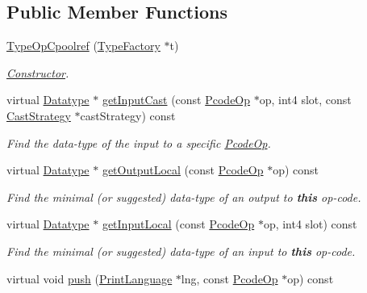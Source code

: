 \subsection*{Public Member Functions}
\begin{DoxyCompactItemize}
\item 
\mbox{\hyperlink{class_type_op_cpoolref_af24f28c844c4c945ef9a223b48d2e955}{Type\+Op\+Cpoolref}} (\mbox{\hyperlink{class_type_factory}{Type\+Factory}} $\ast$t)
\begin{DoxyCompactList}\small\item\em \mbox{\hyperlink{class_constructor}{Constructor}}. \end{DoxyCompactList}\item 
virtual \mbox{\hyperlink{class_datatype}{Datatype}} $\ast$ \mbox{\hyperlink{class_type_op_cpoolref_a5cc9b6921ce5b3672dc96af17134474f}{get\+Input\+Cast}} (const \mbox{\hyperlink{class_pcode_op}{Pcode\+Op}} $\ast$op, int4 slot, const \mbox{\hyperlink{class_cast_strategy}{Cast\+Strategy}} $\ast$cast\+Strategy) const
\begin{DoxyCompactList}\small\item\em Find the data-\/type of the input to a specific \mbox{\hyperlink{class_pcode_op}{Pcode\+Op}}. \end{DoxyCompactList}\item 
virtual \mbox{\hyperlink{class_datatype}{Datatype}} $\ast$ \mbox{\hyperlink{class_type_op_cpoolref_af6f8c8b7ce807d7773e55820c11a08f1}{get\+Output\+Local}} (const \mbox{\hyperlink{class_pcode_op}{Pcode\+Op}} $\ast$op) const
\begin{DoxyCompactList}\small\item\em Find the minimal (or suggested) data-\/type of an output to {\bfseries{this}} op-\/code. \end{DoxyCompactList}\item 
virtual \mbox{\hyperlink{class_datatype}{Datatype}} $\ast$ \mbox{\hyperlink{class_type_op_cpoolref_a08047a47da143613ebf78d36dd22c564}{get\+Input\+Local}} (const \mbox{\hyperlink{class_pcode_op}{Pcode\+Op}} $\ast$op, int4 slot) const
\begin{DoxyCompactList}\small\item\em Find the minimal (or suggested) data-\/type of an input to {\bfseries{this}} op-\/code. \end{DoxyCompactList}\item 
virtual void \mbox{\hyperlink{class_type_op_cpoolref_a595f39446ffc5411594a13318baf64b5}{push}} (\mbox{\hyperlink{class_print_language}{Print\+Language}} $\ast$lng, const \mbox{\hyperlink{class_pcode_op}{Pcode\+Op}} $\ast$op) const

\end{DoxyCompactItemize}
